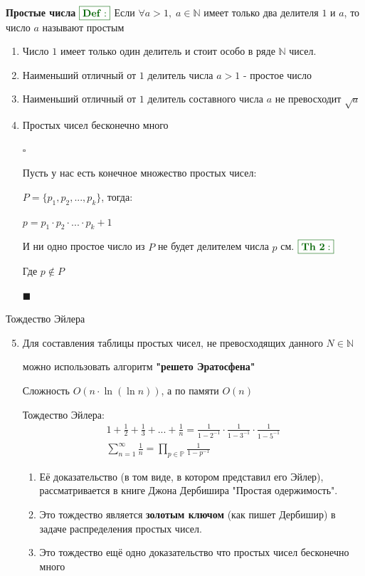 \documentclass[8pt, aspectratio=169]{beamer}
\newcommand{\Def}{{\color{darkgreen}\boxed{\color{darkgreen}\mathbf{Def:}}}}
\newcommand{\Th}[1]{{\color{darkgreen}\boxed{\color{darkgreen}\mathbf{Th~#1:}}}}
\begin{document}
\begin{frame}{\textbf{Простые числа}}
$\Def$ Если $\forall{a} > 1, \; a \in \mathbb{N}$ имеет только два делителя $1$ и $a$, то число $a$ называют простым

\begin{enumerate}
\item Число $1$ имеет только один делитель и стоит особо в ряде $\mathbb{N}$ чисел.

\item Наименьший отличный от $1$ делитель числа $a > 1$ - простое число

\item Наименьший отличный от $1$ делитель составного числа $a$ не превосходит $\sqrt{a}$

\item Простых чисел бесконечно много

$\square$

Пусть у нас есть конечное множество простых чисел:

$P = \{p_1, p_2, ..., p_k\}$, тогда:

$p = p_1\cdot p_2 \cdot ... \cdot p_k + 1$

И ни одно простое число из $P$ не будет делителем числа $p$ см. $\Th{2}$

Где $p \notin P$

$\blacksquare$

\end{enumerate}
\end{frame}

\begin{frame}{Тождество Эйлера}
\begin{enumerate}
\setcounter{enumi}{4}
\item Для составления таблицы простых чисел, не превосходящих данного $N \in \mathbb{N}$

можно использовать алгоритм \textbf{"решето Эратосфена"}

Сложность $O(n\cdot\ln(\ln{n}))$, а по памяти $O(n)$

Тождество Эйлера:
\begin{gather*}
1 + \frac{1}{2} + \frac{1}{3} + ...  + \frac{1}{n} =
\frac{1}{1 - 2^{-1}}\cdot \frac{1}{1 - 3^{-1}} \cdot \frac{1}{1 - 5^{-1}} \\
\sum_{n=1}^{\infty} \frac{1}{n} = \prod_{p \in \mathbb{P}} \frac{1}{1 - p^{-1}}
\end{gather*}

    \begin{enumerate}
    \item Её доказательство (в том виде, в котором представил его Эйлер), рассматривается в книге Джона Дербишира "Простая одержимость".
    \item Это тождество является \textbf{золотым ключом} (как пишет Дербишир) в задаче распределения простых чисел.
    \item Это тождество ещё одно доказательство что простых чисел бесконечно много
    \end{enumerate}
\end{enumerate}
\end{frame}
\end{document}
